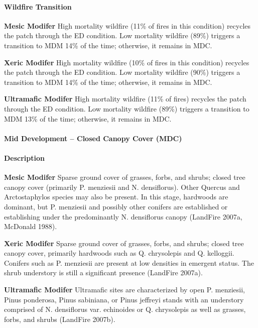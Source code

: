 \paragraph{Wildfire Transition}
\begin{adjustwidth}{2cm}{}
\textbf{Mesic Modifer } High mortality wildfire (11\% of fires in this condition) recycles the patch through the ED condition. Low mortality wildfire (89\%) triggers a transition to MDM 14\% of the time; otherwise, it remains in MDC.

\medskip
\noindent \textbf{Xeric Modifer} High mortality wildfire (10\% of fires in this condition) recycles the patch through the ED condition. Low mortality wildfire (90\%) triggers a transition to MDM 14\% of the time; otherwise, it remains in MDC.

\medskip
\noindent \textbf{Ultramafic Modifer} High mortality wildfire (11\% of fires) recycles the patch through the ED condition. Low mortality wildfire (89\%) triggers a transition to MDM 13\% of the time; otherwise, it remains in MDC.

\end{adjustwidth}
\noindent\hrulefill

\paragraph{Mid Development – Closed Canopy Cover (MDC)}

\paragraph{Description}
\begin{adjustwidth}{2cm}{}
\textbf{Mesic Modifer } Sparse ground cover of grasses, forbs, and shrubs; closed tree canopy cover (primarily P. menziesii and N. densiflorus). Other Quercus and Arctostaphylos species may also be present. In this stage, hardwoods are dominant, but P. menziesii and possibly other conifers are established or establishing under the predominantly N. densiflorus canopy (LandFire 2007a, McDonald 1988). 

\medskip
\noindent \textbf{Xeric Modifer} Sparse ground cover of grasses, forbs, and shrubs; closed tree canopy cover, primarily hardwoods such as Q. chrysolepis and Q. kelloggii. Conifers such as P. menziesii are present at low densities in emergent status. The shrub understory is still a significant presence (LandFire 2007a). 

\medskip
\noindent \textbf{Ultramafic Modifer} Ultramafic sites are characterized by open P. menziesii, Pinus ponderosa, Pinus sabiniana, or Pinus jeffreyi stands with an understory comprised of N. densiflorus var. echinoides or Q. chrysolepis as well as grasses, forbs, and shrubs (LandFire 2007b).

\end{adjustwidth}
